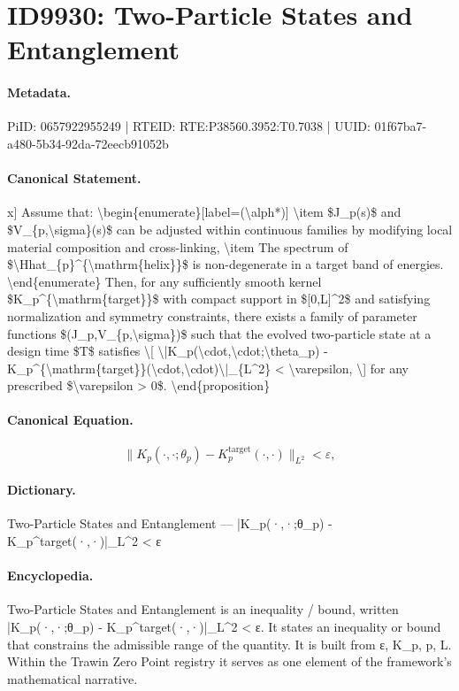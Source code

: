 \section*{ID9930: Two-Particle States and Entanglement}
\paragraph{Metadata.}
PiID: 0657922955249 | RTEID: RTE:P38560.3952:T0.7038 | UUID: 01f67ba7-a480-5b34-92da-72eecb91052b

\paragraph{Canonical Statement.}
x] Assume that: \textbackslash{}begin\{enumerate\}[label=(\textbackslash{}alph*)] \textbackslash{}item \$J\_p(s)\$ and \$V\_\{p,\textbackslash{}sigma\}(s)\$ can be adjusted within continuous families by modifying local material composition and cross-linking, \textbackslash{}item The spectrum of \$\textbackslash{}Hhat\_\{p\}\textasciicircum{}\{\textbackslash{}mathrm\{helix\}\}\$ is non-degenerate in a target band of energies. \textbackslash{}end\{enumerate\} Then, for any sufficiently smooth kernel \$K\_p\textasciicircum{}\{\textbackslash{}mathrm\{target\}\}\$ with compact support in \$[0,L]\textasciicircum{}2\$ and satisfying normalization and symmetry constraints, there exists a family of parameter functions \$(J\_p,V\_\{p,\textbackslash{}sigma\})\$ such that the evolved two-particle state at a design time \$T\$ satisfies \textbackslash{}[ \textbackslash{}|K\_p(\textbackslash{}cdot,\textbackslash{}cdot;\textbackslash{}theta\_p) - K\_p\textasciicircum{}\{\textbackslash{}mathrm\{target\}\}(\textbackslash{}cdot,\textbackslash{}cdot)\textbackslash{}|\_\{L\textasciicircum{}2\} < \textbackslash{}varepsilon, \textbackslash{}] for any prescribed \$\textbackslash{}varepsilon > 0\$. \textbackslash{}end\{proposition\}

\paragraph{Canonical Equation.}
\[
\|K_p(\cdot,\cdot;\theta_p) - K_p^{\mathrm{target}}(\cdot,\cdot)\|_{L^2} < \varepsilon,
\]

\paragraph{Dictionary.}
Two-Particle States and Entanglement — |K\_p(·,·;θ\_p) - K\_p\textasciicircum{}target(·,·)|\_L\textasciicircum{}2 < ε

\paragraph{Encyclopedia.}
Two-Particle States and Entanglement is an inequality / bound, written |K\_p(·,·;θ\_p) - K\_p\textasciicircum{}target(·,·)|\_L\textasciicircum{}2 < ε. It states an inequality or bound that constrains the admissible range of the quantity. It is built from ε, K\_p, p, L. Within the Trawin Zero Point registry it serves as one element of the framework's mathematical narrative.
